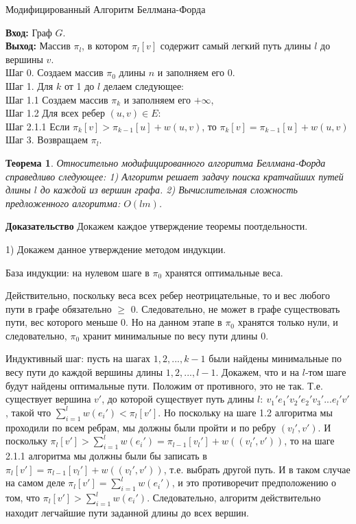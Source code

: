 \documentclass[a4paper,12pt]{report}
\theoremstyle{plain} %
\newtheorem{Theorem}{Теорема}[chapter]
\theoremstyle{definition}
\theoremstyle{remark}
\begin{document}
\begin{large}
\begin{algorithm}
\caption{Модифицированный Алгоритм Беллмана-Форда}
\label{diff_graph_construct}
\textbf{Вход:} Граф $G$.\\
\textbf{Выход:} Массив $\pi_l$, в котором $\pi_l[v]$ содержит самый легкий путь длины $l$ до вершины $v$.\\
Шаг 0. Создаем массив $\pi_0$ длины $n$ и заполняем его $0$. \\
Шаг 1. Для $k$ от 1 до $l$ делаем следующее:\\
Шаг 1.1 Создаем массив $\pi_k$ и заполняем его $+\infty$,\\
Шаг 1.2 Для всех ребер $(u, v) \in E:$\\
Шаг 2.1.1 Если $\pi_k[v] > \pi_{k-1}[u] + w(u,v)$, то $\pi_k[v] = \pi_{k-1}[u] + w(u,v)$\\
Шаг 3. Возвращаем $\pi_l$.\\
\end{algorithm}

\begin{Theorem}
Относительно модифицированного алгоритма Беллмана-Форда справедливо следующее:
1) Алгоритм решает задачу поиска кратчайших путей длины $l$ до каждой из вершин графа.
2) Вычислительная сложность предложенного алгоритма: $O(lm)$.
\end{Theorem}
\textbf{Доказательство}
Докажем каждое утверждение теоремы поотдельности.

1) Докажем данное утверждение методом индукции.

База индукции: на нулевом шаге в $\pi_0$ хранятся оптимальные веса.

Действительно, поскольку веса всех ребер неотрицательные, то и вес любого пути в графе обязательно $\ge$ 0. Следовательно, не может в графе существовать пути, вес которого меньше 0. Но на данном этапе в $\pi_0$ хранятся только нули, и следовательно, $\pi_0$ хранит минимальные по весу пути длины 0.

Индуктивный шаг: пусть на шагах $1, 2, ..., k-1$ были найдены минимальные по весу пути до каждой вершины длины $1, 2, ..., l-1$. Докажем, что и на $l$-том шаге будут найдены оптимальные пути. Положим от противного, это не так. Т.е. существует вершина $v'$, до которой существует путь длины $l: ~ v_1'e_1'v_2'e_2'v_3'...e_l'v'$, такой что $\sum_{i=1}^l w(e_i') < \pi_l[v']$. Но поскольку на шаге 1.2 алгоритма мы проходили по всем ребрам, мы должны были пройти и по ребру $(v_l', v')$. И поскольку $\pi_l[v'] > \sum_{i=1}^l w(e_i') = \pi_{l-1}[v_{l}'] + w( (v_l', v'))$, то на шаге 2.1.1 алгоритма мы должны были бы записать в $\pi_l[v'] = \pi_{l-1}[v_{l}'] + w( (v_l', v'))$, т.е. выбрать другой путь. И в таком случае на самом деле $\pi_l[v'] =  \sum_{i=1}^l w(e_i') $, и это противоречит предположению о том, что $\pi_l[v'] > \sum_{i=1}^l w(e_i')$. Следовательно, алгоритм действительно находит легчайшие пути заданной длины до всех вершин.


\end{large}
\end{document}
